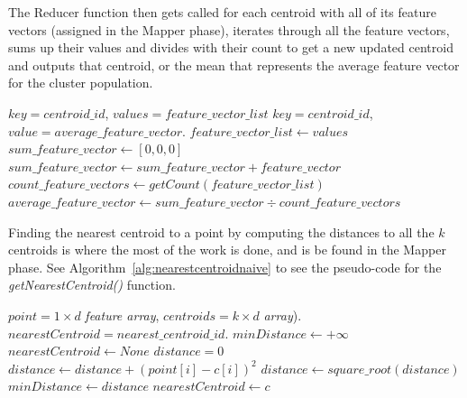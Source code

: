 The Reducer function then gets called for each centroid with all of its feature vectors (assigned in the Mapper phase), iterates through all the feature vectors, sums up their values and divides with their count to get a new updated centroid and outputs that centroid, or the mean that represents the average feature vector for the cluster population.

\begin{center}
\newcommand{\map}{\ensuremath{\mbox{\sc K-means First Version: Reducer}}}
\begin{algorithm}[h!]
\caption{$\map(key,values)$}\label{alg:reducekmeansv1}
\begin{algorithmic}[1]
\REQUIRE $key = centroid\_id$, $values = feature\_vector\_list$
\ENSURE $key = centroid\_id$, $value = average\_feature\_vector$.
\STATE $feature\_vector\_list \leftarrow values$
\medskip
\STATE $sum\_feature\_vector \leftarrow [0, 0, 0]$
	\STATE $sum\_feature\_vector \leftarrow sum\_feature\_vector + feature\_vector$
\ENDFOR
\medskip
\STATE $count\_feature\_vectors \leftarrow getCount(feature\_vector\_list)$
\STATE $average\_feature\_vector \leftarrow sum\_feature\_vector \div count\_feature\_vectors$
\medskip
{}
\end{algorithmic}
\end{algorithm}
\end{center}

Finding the nearest centroid to a point by computing the distances to all the $k$ centroids is where the most of the work is done, and is be found in the Mapper phase. See Algorithm~\ref{alg:nearestcentroidnaive} to see the pseudo-code for the \textit{getNearestCentroid()} function.

\begin{center}
\newcommand{\map}{\ensuremath{\mbox{\sc getNearestCentroid}}}
\begin{algorithm}[h!]
\caption{$\map(point, centroids)$}\label{alg:nearestcentroidnaive}
\begin{algorithmic}[1]
\REQUIRE $point = 1 \times d$ \textit{feature array}, $centroids = k \times d$ \textit{array}).
\ENSURE $nearestCentroid = nearest\_centroid\_id$.
\medskip
\STATE $minDistance \leftarrow +\infty$
\STATE $nearestCentroid \leftarrow None$
	\STATE $distance = 0$
		\STATE $distance \leftarrow distance + (point[i] - c[i])^2$ 
	\ENDFOR
	\STATE $distance \leftarrow square\_root(distance)$
		\STATE $minDistance \leftarrow distance$
		\STATE $nearestCentroid \leftarrow c$
	\ENDIF
\ENDFOR
\medskip
{}
\end{algorithmic}
\end{algorithm}
\end{center}



